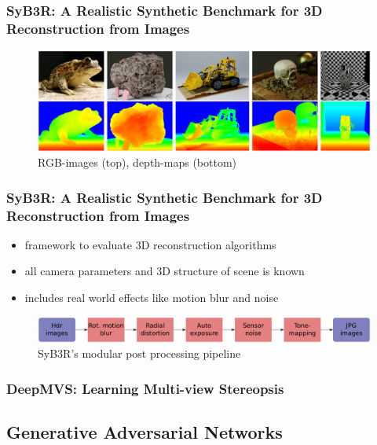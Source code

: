 \documentclass{beamer}
\begin{document}
\begin{frame}
\frametitle{SyB3R: A Realistic Synthetic Benchmark for 3D Reconstruction from Images}
\cite{syb3r}
\begin{figure}
	\includegraphics[width=\linewidth]{../images/SyB3R.png}
	\caption{RGB-images (top), depth-maps (bottom)}
\end{figure}
\end{frame}

\begin{frame}
\frametitle{SyB3R: A Realistic Synthetic Benchmark for 3D Reconstruction from Images}

\begin{itemize}
	\item framework to evaluate 3D reconstruction algorithms
	\item all camera parameters and 3D structure of scene is known
	\item includes real world effects like motion blur and noise
\end{itemize}
\begin{figure}
	\includegraphics[width=\linewidth]{../images/SyB3R_pp.png}
	\caption{SyB3R's modular post processing pipeline}
\end{figure}

\end{frame}

\begin{frame}
	\frametitle{DeepMVS: Learning Multi-view Stereopsis}
	
\end{frame}

\subsection{Generative Adversarial Networks}
\end{document}
